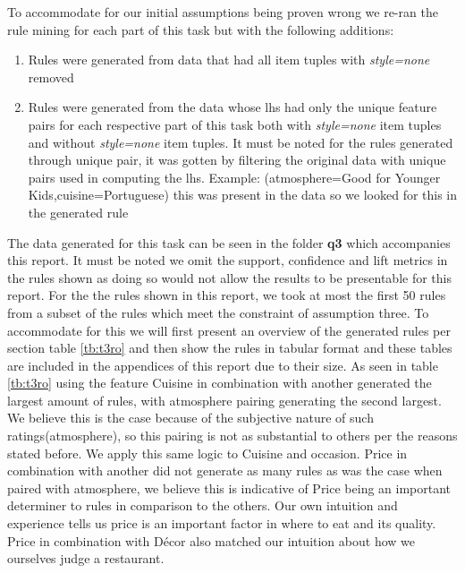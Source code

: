 \documentclass[letterpaper,10pt]{article}
\begin{document}
To accommodate for our initial assumptions being proven wrong we re-ran the rule mining for each part of this task but with the following additions:
\begin{enumerate}
\item Rules were generated from data that had all item tuples with \textit{style=none} removed
\item Rules were generated from the data whose lhs had only the unique feature pairs for each respective part of this task both with \textit{style=none} item tuples and without \textit{style=none} item tuples. It must be noted for the rules generated through unique pair, it was gotten by filtering the original data with unique pairs used in computing the lhs. Example: (atmosphere=Good for Younger Kids,cuisine=Portuguese) this was present in the data so we looked for this in the generated rule 
\end{enumerate} 
The data generated for this task can be seen in the folder \textbf{q3} which accompanies this report. It must be noted we omit the support, confidence and lift metrics in the rules shown as doing so would not allow the results to be presentable for this report. For the the rules shown in this report, we took at most the first 50 rules from a subset of the rules which meet the constraint of assumption three. To accommodate for this we will first present an overview of the generated rules per section table  \hyperref[tb:t3ro]{\ref{tb:t3ro}} and then show the rules in tabular format and these tables are included in the appendices of this report due to their size.\newline \newline
As seen in table \hyperref[tb:t3ro]{\ref{tb:t3ro}} using the feature Cuisine in combination with another generated the largest amount of rules, with atmosphere pairing generating the second largest. We believe this is the case because of the subjective nature of such ratings(atmosphere), so this pairing is not as substantial to others per the reasons stated before. We apply this same logic to Cuisine and occasion. Price in combination with another did not generate as many rules as was the case when paired with atmosphere, we believe this is indicative of Price being an important determiner to rules in comparison  to the others. Our own intuition and experience tells us price is an important factor in where to eat and its quality. Price in combination with D\'{e}cor also matched our intuition about how we ourselves judge a restaurant.
\end{document}
